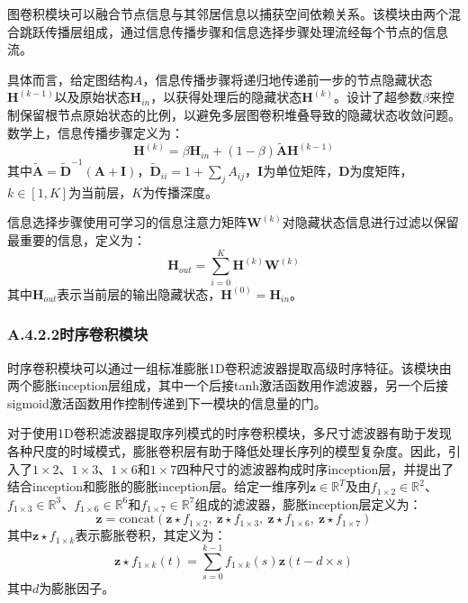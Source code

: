 图卷积模块可以融合节点信息与其邻居信息以捕获空间依赖关系。该模块由两个混合跳跃传播层组成，通过信息传播步骤和信息选择步骤处理流经每个节点的信息流。

具体而言，给定图结构$A$，信息传播步骤将递归地传递前一步的节点隐藏状态$\boldsymbol{H}^{(k-1)}$以及原始状态$\boldsymbol{H}_{in}$，以获得处理后的隐藏状态$\boldsymbol{H}^{(k)}$。设计了超参数$\beta$来控制保留根节点原始状态的比例，以避免多层图卷积堆叠导致的隐藏状态收敛问题。数学上，信息传播步骤定义为：
\begin{equation}
\boldsymbol{H}^{(k)} = \beta \boldsymbol{H}_{in} + (1-\beta)\tilde{\boldsymbol{A}}\boldsymbol{H}^{(k-1)}
\end{equation}
其中$\tilde{\boldsymbol{A}} = \tilde{\boldsymbol{D}}^{-1}(\boldsymbol{A}+\boldsymbol{I})$，$\tilde{\boldsymbol{D}}_{ii} = 1 + \sum_j A_{ij}$，$\boldsymbol{I}$为单位矩阵，$\boldsymbol{D}$为度矩阵，$k \in [1, K]$为当前层，$K$为传播深度。

信息选择步骤使用可学习的信息注意力矩阵$\boldsymbol{W}^{(k)}$对隐藏状态信息进行过滤以保留最重要的信息，定义为：
\begin{equation}
\boldsymbol{H}_{out} = \sum_{i=0}^{K} \boldsymbol{H}^{(k)}\boldsymbol{W}^{(k)}
\end{equation}
其中$\boldsymbol{H}_{out}$表示当前层的输出隐藏状态，$\boldsymbol{H}^{(0)} = \boldsymbol{H}_{in}$。

\subsubsection*{A.4.2.2\quad 时序卷积模块}

时序卷积模块可以通过一组标准膨胀1D卷积滤波器提取高级时序特征。该模块由两个膨胀inception层组成，其中一个后接tanh激活函数用作滤波器，另一个后接sigmoid激活函数用作控制传递到下一模块的信息量的门。

对于使用1D卷积滤波器提取序列模式的时序卷积模块，多尺寸滤波器有助于发现各种尺度的时域模式，膨胀卷积层有助于降低处理长序列的模型复杂度。因此，引入了$1 \times 2$、$1 \times 3$、$1 \times 6$和$1 \times 7$四种尺寸的滤波器构成时序inception层，并提出了结合inception和膨胀的膨胀inception层。给定一维序列$\boldsymbol{z} \in \mathbb{R}^T$及由$f_{1\times2} \in \mathbb{R}^2$、$f_{1\times3} \in \mathbb{R}^3$、$f_{1\times6} \in \mathbb{R}^6$和$f_{1\times7} \in \mathbb{R}^7$组成的滤波器，膨胀inception层定义为：
\begin{equation}
\boldsymbol{z} = \mathrm{concat}(\boldsymbol{z} \star f_{1\times2},\ \boldsymbol{z} \star f_{1\times3},\ \boldsymbol{z} \star f_{1\times6},\ \boldsymbol{z} \star f_{1\times7})
\end{equation}
其中$\boldsymbol{z} \star f_{1\times k}$表示膨胀卷积，其定义为：
\begin{equation}
\boldsymbol{z} \star f_{1\times k}(t) = \sum_{s=0}^{k-1} f_{1\times k}(s) \boldsymbol{z}(t - d \times s)
\end{equation}
其中$d$为膨胀因子。

